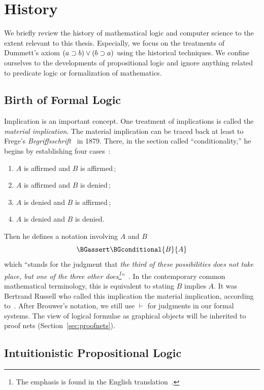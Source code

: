 \section{History}

We briefly review the history of mathematical logic and computer science
to the extent relevant to this thesis.
Especially, we focus on the treatments of Dummett's axiom $(a\supset
b)\lor(b\supset a)$ using the historical techniques.
We confine ourselves to the developments of propositional logic and
ignore anything related to predicate logic or formalization of
mathematics.

\subsection{Birth of Formal Logic}

Implication is an important concept.
One treatment of implications is called the \textit{material
implication}.
The material implication can be traced back at least to
Frege's \textit{Begriffsschrift}~\citep{frege} in 1879.
There, in the
section called ``conditionality,''
he begins by establishing four cases~\citep[p.~13]{frege}:
\begin{enumerate}
 \item $A$ is affirmed and $B$ is affirmed\,;
 \item $A$ is affirmed and $B$ is denied\,;
 \item $A$ is denied and $B$ is affirmed\,;
 \item $A$ is denied and $B$ is denied.
\end{enumerate}
Then he defines a notation involving $A$ and $B$
\[
\BGassert\BGconditional{B}{A}
\]
which ``stands for the
judgment that \textit{the third of these possibilities does not take
place, but one of the three other does\footnote{The emphasis is found in
the English translation~\citep[p.~14]{frege}.}}''~\citep[p.~14]{frege}.
In the contemporary common mathematical terminology, this is equivalent
to stating $B$ implies $A$.
It was Bertrand Russell who called this implication the material
implication,
according to~\citet{sep-conditionals}.
After Brouwer's notation, we still use $\vdash$ for judgments in our formal
systems.
The view of logical formulae as graphical objects
will be inherited to proof nets (Section~\ref{sec:proofnets}).

\subsection{Intuitionistic Propositional Logic}

